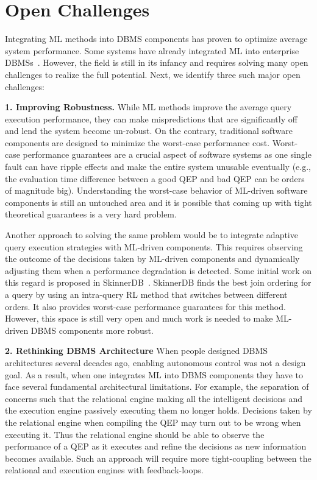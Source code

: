\section{Open Challenges}
Integrating ML methods into DBMS components has proven to optimize average system performance.
Some systems have already integrated ML into enterprise DBMSs~\cite{leo, cardlearner, verdict}.
However, the field is still in its infancy and requires solving many open challenges to realize the full potential.
Next, we identify three such major open challenges:


\vspace{2mm}
\noindent \textbf{1. Improving Robustness.} While ML methods improve the average query execution performance, they can make mispredictions that are significantly off and lend the system become un-robust.
On the contrary, traditional software components are designed to minimize the worst-case performance cost.
Worst-case performance guarantees are a crucial aspect of software systems as one single fault can have ripple effects and make the entire system unusable eventually (e.g., the evaluation time difference between a good QEP and bad QEP can be orders of magnitude big).
Understanding the worst-case behavior of ML-driven software components is still an untouched area and it is possible that coming up with tight theoretical guarantees is a very hard problem.
 
Another approach to solving the same problem would be to integrate adaptive query execution strategies with ML-driven components.
This requires observing the outcome of the decisions taken by ML-driven components and dynamically adjusting them when a performance degradation is detected.
Some initial work on this regard is proposed in SkinnerDB~\cite{skinnerdb}.
SkinnerDB finds the best join ordering for a query by using an intra-query RL method that switches between different orders.
It also provides worst-case performance guarantees for this method.
However, this space is still very open and much work is needed to make ML-driven DBMS components more robust.


\vspace{2mm}
\noindent \textbf{2. Rethinking DBMS Architecture} When people designed DBMS architectures several decades ago, enabling autonomous control was not a design goal.
As a result, when one integrates ML into DBMS components they have to face several fundamental architectural limitations.
For example, the separation of concerns such that the relational engine making all the intelligent decisions and the execution engine passively executing them no longer holds.
Decisions taken by the relational engine when compiling the QEP may turn out to be wrong when executing it.
Thus the relational engine should be able to observe the performance of a QEP as it executes and refine the decisions as new information becomes available.
Such an approach will require more tight-coupling between the relational and execution engines with feedback-loops.

